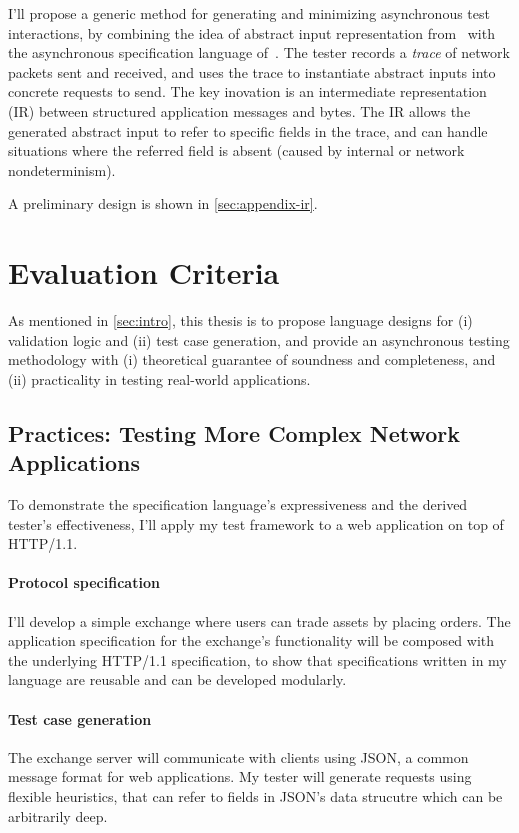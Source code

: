 \documentclass{article}
\newcommand{\http}{HTTP/1.1\xspace}
\theoremstyle{definition}
\begin{document}
I'll propose a generic method for generating and minimizing asynchronous test
interactions, by combining the idea of abstract input representation
from~\textcite{Hughes2007} with the asynchronous specification language
of~\textcite{issta21}.  The tester records a {\em trace} of network
packets sent and received, and uses the trace to instantiate abstract inputs
into concrete requests to send.  The key inovation is an intermediate
representation (IR) between structured application messages and bytes.  The IR
allows the generated abstract input to refer to specific fields in the trace,
and can handle situations where the referred field is absent (caused by internal
or network nondeterminism).

A preliminary design is shown in \autoref{sec:appendix-ir}.

\section{Evaluation Criteria}
\label{sec:criteria}

As mentioned in \autoref{sec:intro}, this thesis is to propose language designs
for (i) validation logic and (ii) test case generation, and provide an
asynchronous testing methodology with (i) theoretical guarantee of soundness and
completeness, and (ii) practicality in testing real-world applications.

\subsection{Practices: Testing More Complex Network Applications}
To demonstrate the specification language's expressiveness and the derived
tester's effectiveness, I'll apply my test framework to a web application on top
of \http.

\paragraph{Protocol specification}
I'll develop a simple exchange where users can trade assets by placing orders.
The application specification for the exchange's functionality will be composed
with the underlying \http specification, to show that specifications written in
my language are reusable and can be developed modularly.

\paragraph{Test case generation}
The exchange server will communicate with clients using JSON, a common message
format for web applications.  My tester will generate requests using flexible
heuristics, that can refer to fields in JSON's data strucutre which can be
arbitrarily deep.
\end{document}
